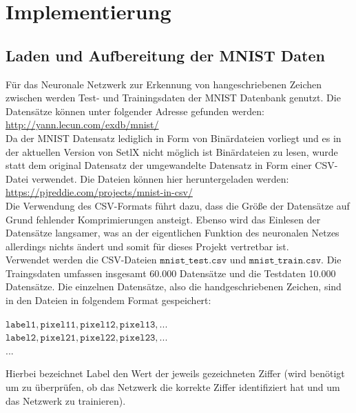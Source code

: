 \chapter{Implementierung}

\section{Laden und Aufbereitung der MNIST Daten}
Für das Neuronale Netzwerk zur Erkennung von hangeschriebenen Zeichen zwischen werden Test- und Trainingsdaten der MNIST Datenbank genutzt. Die Datensätze können unter folgender Adresse gefunden werden: 
\\[0.2cm]
\hspace*{1.3cm}
\href{http://yann.lecun.com/exdb/mnist/}{http://yann.lecun.com/exdb/mnist/}
\\[0.2cm]
Da der MNIST Datensatz lediglich in Form von Binärdateien vorliegt und es in der aktuellen Version von SetlX nicht möglich ist Binärdateien zu lesen, wurde statt dem original Datensatz der umgewandelte Datensatz in Form einer CSV-Datei verwendet. Die Dateien können hier heruntergeladen werden:
\\[0.2cm]
\hspace*{1.3cm}
\href{https://pjreddie.com/projects/mnist-in-csv/}{https://pjreddie.com/projects/mnist-in-csv/}
\\[0.2cm]
Die Verwendung des CSV-Formats führt dazu, dass die Größe der Datensätze auf Grund fehlender Komprimierungen ansteigt. Ebenso wird das Einlesen der Datensätze langsamer, was an der eigentlichen Funktion des neuronalen Netzes allerdings nichts ändert und somit für dieses Projekt vertretbar ist. \\
Verwendet werden die CSV-Dateien $\mathtt{mnist\_test.csv}$ und $\mathtt{mnist\_train.csv}$. Die Traingsdaten umfassen insgesamt 60.000 Datensätze und die Testdaten 10.000 Datensätze. 
Die einzelnen Datensätze, also die handgeschriebenen Zeichen, sind in den Dateien in folgendem Format gespeichert:
\begin{center}
	$\mathtt{label1, pixel11, pixel12, pixel13, ...}$ \\
	$\mathtt{label2, pixel21, pixel22, pixel23, ...}$ \\
	...
\end{center}
Hierbei bezeichnet Label den Wert der jeweils gezeichneten Ziffer (wird benötigt um zu überprüfen, ob das Netzwerk die korrekte Ziffer identifiziert hat und um das Netzwerk zu trainieren). \\ \\

